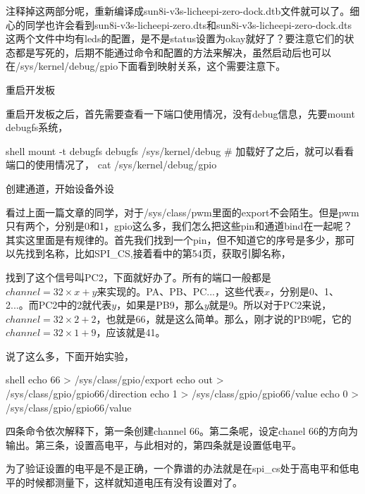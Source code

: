 \documentclass[lang=cn,newtx,10pt,scheme=chinese]{elegantbook}
\begin{document}
注释掉这两部分呢，重新编译成sun8i-v3s-licheepi-zero-dock.dtb文件就可以了。细心的同学也许会看到sun8i-v3s-licheepi-zero.dts和sun8i-v3s-licheepi-zero-dock.dts这两个文件中均有leds的配置，是不是status设置为okay就好了？要注意它们的状态都是写死的，后期不能通过命令和配置的方法来解决，虽然启动后也可以在/sys/kernel/debug/gpio下面看到映射关系，这个需要注意下。

重启开发板

重启开发板之后，首先需要查看一下端口使用情况，没有debug信息，先要mount debugfs系统，

\begin{mycode}{shell}
mount -t debugfs debugfs /sys/kernel/debug
# 加载好了之后，就可以看看端口的使用情况了，
cat /sys/kernel/debug/gpio
\end{mycode}

创建通道，开始设备外设

看过上面一篇文章的同学，对于/sys/class/pwm里面的export不会陌生。但是pwm只有两个，分别是0和1，gpio这么多，我们怎么把这些pin和通道bind在一起呢？其实这里面是有规律的。首先我们找到一个pin，但不知道它的序号是多少，那可以先找到名称，比如SPI\_CS,接着看中的第54页，获取引脚名称，

找到了这个信号叫PC2，下面就好办了。所有的端口一般都是$channel = 32 \times x+y$来实现的。PA、PB、PC...，这些代表$x$，分别是0、1、2...。而PC2中的2就代表$y$，如果是PB9，那么$y$就是9。所以对于PC2来说，$channel = 32 \times 2+ 2$，也就是66，就是这么简单。那么，刚才说的PB9呢，它的$channel = 32 \times 1 + 9$，应该就是41。

说了这么多，下面开始实验，

\begin{mycode}{shell}
echo 66 > /sys/class/gpio/export
echo out > /sys/class/gpio/gpio66/direction
echo 1 > /sys/class/gpio/gpio66/value
echo 0 > /sys/class/gpio/gpio66/value
\end{mycode}

四条命令依次解释下，第一条创建channel 66。第二条呢，设定chanel 66的方向为输出。第三条，设置高电平，与此相对的，第四条就是设置低电平。

为了验证设置的电平是不是正确，一个靠谱的办法就是在spi\_cs处于高电平和低电平的时候都测量下，这样就知道电压有没有设置对了。
\end{document}
